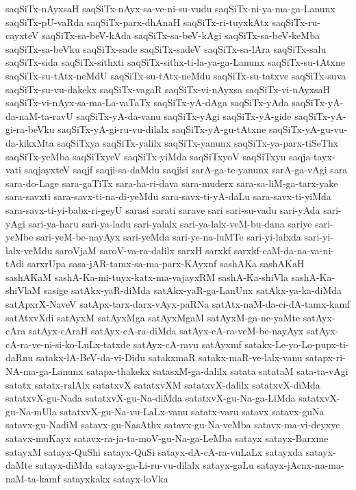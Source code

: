 {saqSiTx-nAyxsaH
saqSiTx-nAyx-sa-ve-ni-su-vudu
saqSiTx-ni-ya-ma-ga-Lanunx
saqSiTx-pU-vaRda
saqSiTx-parx-dhAnaH
saqSiTx-ri-tuyxkAtx
saqSiTx-ru-cayxteV
saqSiTx-sa-beV-kAda
saqSiTx-sa-beV-kAgi
saqSiTx-sa-beV-keMba
saqSiTx-sa-beVku
saqSiTx-sade
saqSiTx-sadeV
saqSiTx-sa-lAra
saqSiTx-salu
saqSiTx-sida
saqSiTx-sithxti
saqSiTx-sithx-ti-la-ya-ga-Lanunx
saqSiTx-su-tAtxne
saqSiTx-su-tAtx-neMdU
saqSiTx-su-tAtx-neMdu
saqSiTx-su-tatxve
saqSiTx-suva
saqSiTx-su-vu-dakekx
saqSiTx-vagaR
saqSiTx-vi-nAyxsa
saqSiTx-vi-nAyxsaH
saqSiTx-vi-nAyx-sa-ma-La-vaTaTx
saqSiTx-yA-dAga
saqSiTx-yAda
saqSiTx-yA-da-naM-ta-ravU
saqSiTx-yA-da-vanu
saqSiTx-yAgi
saqSiTx-yA-gide
saqSiTx-yA-gi-ra-beVku
saqSiTx-yA-gi-ru-vu-dilalx
saqSiTx-yA-gu-tAtxne
saqSiTx-yA-gu-vu-da-kikxMta
saqSiTxya
saqSiTx-yalilx
saqSiTx-yanunx
saqSiTx-ya-parx-tiSeThx
saqSiTx-yeMba
saqSiTxyeV
saqSiTx-yiMda
saqSiTxyoV
saqSiTxyu
saqja-tayx-vati
saqjayxteV
saqjf
saqji-sa-daMdu
saqjisi
sarA-ga-te-yanunx
sarA-ga-vAgi
sara
sara-do-Lage
sara-gaTiTx
sara-ha-ri-dava
sara-muderx
sara-sa-liM-ga-tarx-yake
sara-savxti
sara-savx-ti-na-di-yeMdu
sara-savx-ti-yA-daLu
sara-savx-ti-yiMda
sara-savx-ti-yi-babx-ri-geyU
sarasi
sarati
sarave
sari
sari-su-vadu
sari-yAda
sari-yAgi
sari-ya-haru
sari-ya-ladu
sari-yalalx
sari-ya-lalx-veM-bu-dana
sariye
sari-yeMbe
sari-yeM-be-nayAyx
sari-yeMda
sari-ye-na-luMTe
sari-yi-lalxda
sari-yi-lalx-veMdu
saroVjaM
saroV-va-ra-dalilx
sarxH
sarxkf
sarxkf-caM-da-na-va-ni-tAdi
sarxrUpa
sasa-jAR-tamx-sa-ma-parx-KAyxnf
sashAKa
sashAKaH
sashAKaM
sashA-Ka-mi-tuyx-katx-ma-vajayxRM
sashA-Ka-shiVla
sashA-Ka-shiVlaM
sasige
satAkx-yaR-diMda
satAkx-yaR-ga-LanUnx
satAkx-ya-ka-diMda
satApxrX-NaveV
satApx-tarx-darx-vAyx-paRNa
satAtx-naM-da-ci-dA-tamx-kamf
satAtxvXdi
satAyxM
satAyxMga
satAyxMgaM
satAyxM-ga-ne-yaMte
satAyx-cAra
satAyx-cAraH
satAyx-cA-ra-diMda
satAyx-cA-ra-veM-be-nayAyx
satAyx-cA-ra-ve-ni-si-ko-LuLx-tatxde
satAyx-cA-ravu
satAyxmf
satakx-Le-yo-Lo-pupx-ti-daRnu
satakx-lA-BeV-da-vi-Didu
satakxmaR
satakx-maR-ve-lalx-vanu
satapx-ri-NA-ma-ga-Lanunx
satapx-thakekx
satasxM-ga-dalilx
satata
satataM
sata-ta-vAgi
satatx
satatx-ralAlx
satatxvX
satatxvXM
satatxvX-dalilx
satatxvX-diMda
satatxvX-gu-Nada
satatxvX-gu-Na-diMda
satatxvX-gu-Na-ga-LiMda
satatxvX-gu-Na-mUla
satatxvX-gu-Na-vu-LaLx-vanu
satatx-varu
satavx
satavx-guNa
satavx-gu-NadiM
satavx-gu-NasAthx
satavx-gu-Na-veMba
satavx-ma-vi-deyxye
satavx-muKayx
satavx-ra-ja-ta-moV-gu-Na-ga-LeMba
satayx
satayx-Barxme
satayxM
satayx-QuShi
satayx-QuSi
satayx-dA-cA-ra-vuLaLx
satayxda
satayx-daMte
satayx-diMda
satayx-ga-Li-ru-vu-dilalx
satayx-gaLu
satayx-jAcnx-na-ma-naM-ta-kamf
satayxkakx
satayx-loVka
}
